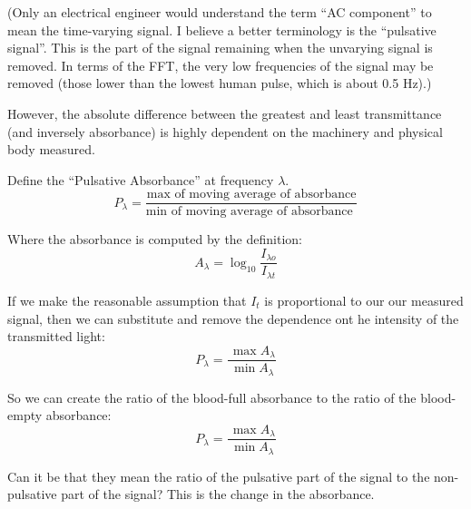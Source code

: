 \documentclass[11pt]{article}
\renewcommand{\min}{\expandafter\,\operatorname*{min}}
\renewcommand{\max}{\expandafter\,\operatorname*{max}}
\begin{document}
(Only an electrical engineer would understand the term ``AC component'' to
mean the time-varying signal. I believe a better terminology is the
``pulsative signal''. This is the part of the signal remaining when the
unvarying signal is removed. In terms of the FFT, the very low frequencies
of the signal may be removed (those lower than the lowest human pulse, which
is about 0.5 Hz).)

However, the absolute difference between the greatest and least
transmittance (and inversely absorbance) is highly dependent on the
machinery and physical body measured.

Define the ``Pulsative Absorbance'' at frequency $\lambda$. 
\begin{equation}
  P_{\lambda} = \frac{\text{max of moving average of absorbance}}
  {\text{min of moving average of absorbance }}
\end{equation}

Where the absorbance is computed by the definition:
\begin{equation}
 A_{\lambda} = \log_{10} \frac{I_{\lambda o}}{I_{\lambda t}}   
\end{equation}

If we make the reasonable assumption that $I_t$ is proportional
to our our measured signal, then we can substitute and
remove the dependence ont he intensity of the transmitted light:
\begin{equation}
  P_{\lambda} = \frac{\max{A_{\lambda}}}
  {\min{A_{\lambda}}}
\end{equation}

So we can create the ratio of the blood-full absorbance
to the ratio of the blood-empty absorbance:
\begin{equation}
  P_{\lambda} = \frac{\max{A_{\lambda}}}
  {\min{A_{\lambda}}}
\end{equation}




Can it be that they mean the ratio of the pulsative part of the signal
to the non-pulsative part of the signal?  This is the change in
the absorbance.










\end{document}
